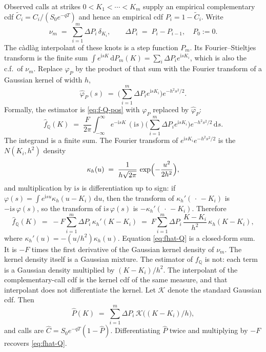 \documentclass[preprint,12pt,authoryear,times]{elsarticle}
\newcommand{\Q}{\mathbb{Q}}
\begin{document}
Observed calls at strikes \(0<K_1<\cdots<K_m\) supply an empirical complementary cdf \(\tilde C_i=C_i/(S_0e^{-qT})\) and hence an empirical cdf \(P_i=1-\tilde C_i\). Write
\begin{equation}
\label{eq:nu}
\nu_m
\;=\;
\sum_{i=1}^m\Delta P_i\,\delta_{K_i},
\qquad
\Delta P_i
\;=\;
P_i-P_{i-1},
\quad
P_0:=0.
\end{equation}
The c\`adl\`ag interpolant of these knots is a step function \(P_m\). Its Fourier--Stieltjes transform is the finite sum \(\int e^{\mathrm{i}s K}\,\mathrm{d}P_m(K)=\sum_i\Delta P_i e^{\mathrm{i}s K_i}\), which is also the c.f.\ of \(\nu_m\). Replace \(\varphi_P\) by the product of that sum with the Fourier transform of a Gaussian kernel of width \(h\),
\begin{equation}
\label{eq:phi-hat}
\hat\varphi_P(s)
\;=\;
\Biggl(\sum_{i=1}^m\Delta P_i e^{\mathrm{i}s K_i}\Biggr)e^{-h^2 s^2/2}.
\end{equation}
Formally, the estimator is \eqref{eq:f-Q-pos} with \(\varphi_P\) replaced by \(\hat\varphi_P\):
\begin{equation}
\label{eq:fhat-Q-ft}
\hat f_{\Q}(K)
\;=\;
\frac{F}{2\pi}\int_{-\infty}^{\infty}e^{-\mathrm{i}s K}\,(\mathrm{i}s)\Biggl(\sum_{i=1}^m\Delta P_i e^{\mathrm{i}s K_i}\Biggr)e^{-h^2 s^2/2}\,\mathrm{d}s.
\end{equation}
The integrand is a finite sum. The Fourier transform of \(e^{\mathrm{i}s K_i}e^{-h^2 s^2/2}\) is the \(N(K_i,h^2)\) density
\begin{equation}
\label{eq:kappa}
\kappa_h(u)
\;=\;
\frac{1}{h\sqrt{2\pi}}\,\exp\Bigl(-\frac{u^2}{2h^2}\Bigr),
\end{equation}
and multiplication by \(\mathrm{i}s\) is differentiation up to sign: if \(\varphi(s)=\int e^{\mathrm{i}s u}\kappa_h(u-K_i)\,\mathrm{d}u\), then the transform of \(\kappa_h'(\,\cdot\,-K_i)\) is \(-\mathrm{i}s\,\varphi(s)\), so the transform of \(\mathrm{i}s\,\varphi(s)\) is \(-\kappa_h'(\,\cdot\,-K_i)\). Therefore
\begin{equation}
\label{eq:fhat-Q}
\hat f_{\Q}(K)
\;=\;
-F\sum_{i=1}^m\Delta P_i\,\kappa_h'(K-K_i)
\;=\;
F\sum_{i=1}^m\Delta P_i\,\frac{K-K_i}{h^2}\,\kappa_h(K-K_i),
\end{equation}
where \(\kappa_h'(u)=-(u/h^2)\kappa_h(u)\). Equation \eqref{eq:fhat-Q} is a closed-form sum. It is \(-F\) times the first derivative of the Gaussian kernel density of \(\nu_m\). The kernel density itself is a Gaussian mixture. The estimator of \(f_{\Q}\) is not: each term is a Gaussian density multiplied by \((K-K_i)/h^2\). The interpolant of the complementary-call cdf is the kernel cdf of the same measure, and that interpolant does not differentiate the kernel. Let \(\mathcal{K}\) denote the standard Gaussian cdf. Then
\begin{equation}
\label{eq:P-hat}
\hat P(K)
\;=\;
\sum_{i=1}^m\Delta P_i\,\mathcal{K}\bigl((K-K_i)/h\bigr),
\end{equation}
and calls are \(\hat C=S_0e^{-qT}(1-\hat P)\). Differentiating \(\hat P\) twice and multiplying by \(-F\) recovers \eqref{eq:fhat-Q}.
\label{sec:closed}
\end{document}
